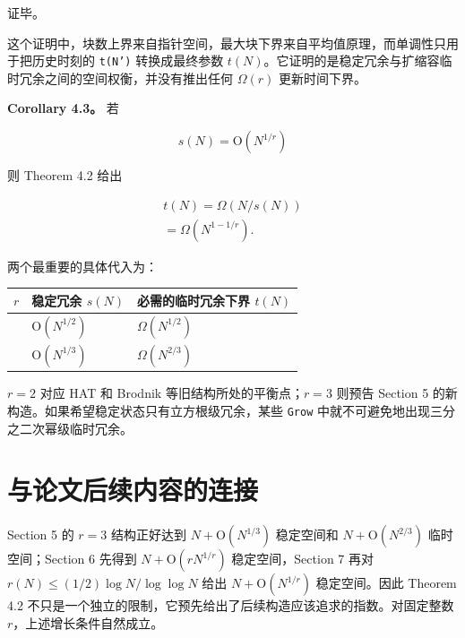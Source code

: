 \documentclass[UTF8,11pt,a4paper]{ctexart}
\begin{document}
证毕。\par

这个证明中，块数上界来自指针空间，最大块下界来自平均值原理，而单调性只用于把历史时刻的 \textnormal{\texttt{t(N')}} 转换成最终参数 $t(N)$。它证明的是稳定冗余与扩缩容临时冗余之间的空间权衡，并没有推出任何 $\Omega(r)$ 更新时间下界。\par

\textbf{Corollary 4.3。} 若\par

\[
  s(N)=\mathrm{O}(N^{1/r})
\]

则 Theorem 4.2 给出\par

\[
\begin{aligned}
  t(N) = \Omega(N/s(N)) \\
  = \Omega(N^{1-1/r}).
\end{aligned}
\]

两个最重要的具体代入为：\par

\begin{center}
\small
\begin{tabularx}{\textwidth}{@{}>{\raggedright\arraybackslash}X>{\raggedright\arraybackslash}X>{\raggedright\arraybackslash}X@{}}
\toprule
\textbf{$r$} & \textbf{稳定冗余 $s(N)$} & \textbf{必需的临时冗余下界 $t(N)$} \\
\midrule
2 & $\mathrm{O}(N^{1/2})$ & $\Omega(N^{1/2})$ \\
3 & $\mathrm{O}(N^{1/3})$ & $\Omega(N^{2/3})$ \\
\bottomrule
\end{tabularx}
\end{center}

$r=2$ 对应 HAT 和 Brodnik 等旧结构所处的平衡点；$r=3$ 则预告 Section 5 的新构造。如果希望稳定状态只有立方根级冗余，某些 \textnormal{\texttt{Grow}} 中就不可避免地出现三分之二次幂级临时冗余。\par

\section{与论文后续内容的连接}

Section 5 的 $r=3$ 结构正好达到 $N+\mathrm{O}(N^{1/3})$ 稳定空间和 $N+\mathrm{O}(N^{2/3})$ 临时空间；Section 6 先得到 $N+\mathrm{O}(rN^{1/r})$ 稳定空间，Section 7 再对 $r(N) \leq  (1/2) \log N / \log \log N$ 给出 $N+\mathrm{O}(N^{1/r})$ 稳定空间。因此 Theorem 4.2 不只是一个独立的限制，它预先给出了后续构造应该追求的指数。对固定整数 $r$，上述增长条件自然成立。\par
\end{document}
